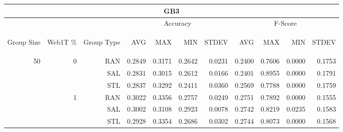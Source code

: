 \begin{center}
\begin{table}[htbp]
\begin{tabular}{ | r | r | r | r | r | r | r | r | r | r | r |}
\hline
\multicolumn{11}{|c|}{GB3}\\
\hline
 & & & \multicolumn{4}{|c|}{Accuracy} & \multicolumn{4}{|c|}{F-Score}\\ \cline{4-11}
\begin{sideways}Group Size\end{sideways} & \begin{sideways}Web1T \%\end{sideways} & \begin{sideways}Group Type\end{sideways} & \begin{sideways}AVG\end{sideways} & \begin{sideways}MAX\end{sideways} & \begin{sideways}MIN\end{sideways} & \begin{sideways}STDEV\end{sideways} & \begin{sideways}AVG\end{sideways} & \begin{sideways}MAX\end{sideways} & \begin{sideways}MIN\end{sideways} & \begin{sideways}STDEV\end{sideways}\\
\hline
\multirow{18}{*}{50}
 & \multirow{3}{*}{0} & RAN & 0.2849 & 0.3171 & 0.2642 & 0.0231 & 0.2400 & 0.7606 & 0.0000 & 0.1753\\ \cline{3-11}
 &   & SAL & 0.2831 & 0.3015 & 0.2612 & 0.0166 & 0.2401 & 0.8955 & 0.0000 & 0.1791\\ \cline{3-11}
 &   & STL & 0.2837 & 0.3292 & 0.2411 & 0.0360 & 0.2569 & 0.7788 & 0.0000 & 0.1759\\ \cline{2-11}
 & \multirow{3}{*}{1} & RAN & 0.3022 & 0.3356 & 0.2757 & 0.0249 & 0.2751 & 0.7892 & 0.0000 & 0.1555\\ \cline{3-11}
 &   & SAL & 0.3002 & 0.3108 & 0.2923 & 0.0078 & 0.2742 & 0.8219 & 0.0235 & 0.1583\\ \cline{3-11}
 &   & STL & 0.2928 & 0.3354 & 0.2686 & 0.0302 & 0.2744 & 0.8073 & 0.0000 & 0.1568\\ \cline{2-11}

\end{tabular}
\end{table}
\end{center}
